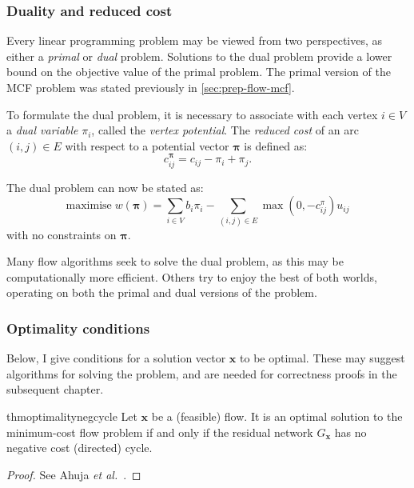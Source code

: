 \subsubsection{Duality and reduced cost} \label{sec:prep-flow-rc-and-dual}


Every linear programming problem may be viewed from two perspectives, as either a \emph{primal} or \emph{dual} problem. Solutions to the dual problem provide a lower bound on the objective value of the primal problem. The primal version of the MCF problem was stated previously in \cref{sec:prep-flow-mcf}. 

To formulate the dual problem, it is necessary to associate with each vertex $i \in V$ a \emph{dual variable} $\pi_i$, called the \emph{vertex potential}. The \emph{reduced cost} of an arc $(i,j)\in E$ with respect to a potential vector $\boldsymbol{\pi}$ is defined as:
\begin{equation} \label{eq:reduced-costs}
c_{ij}^{\boldsymbol{\pi}}=c_{ij}-\pi_{i}+\pi_{j}.
\end{equation}

The dual problem can now be stated as:
\begin{equation}
\mathrm{maximise}\; w(\boldsymbol{\pi})=\sum_{i\in V}b_{i}\pi_{i}-\sum_{(i,j)\in E}\max\left(0,-c_{ij}^{\pi}\right)u_{ij}
\end{equation}
with no constraints on $\boldsymbol{\pi}$.

Many flow algorithms seek to solve the dual problem, as this may be computationally more efficient. Others try to enjoy the best of both worlds, operating on both the primal and dual versions of the problem.

\subsubsection{Optimality conditions} \label{sec:prep-flow-optimality}


Below, I give conditions for a solution vector $\mathbf{x}$ to be optimal. These may suggest algorithms for solving the problem, and are needed for correctness proofs in the subsequent chapter. \\

\begin{restatable}{thm}{optimalitynegcycle}
\label{thm:optimality-neg-cycle}
Let $\mathbf{x}$ be a (feasible) flow. It is an optimal solution to the minimum-cost flow problem if and only if the residual network $G_\mathbf{x}$ has no negative cost (directed) cycle.
\end{restatable}
\begin{proof}
See Ahuja \textit{et al.}~\cite[p.~307]{Ahuja:1993}.
\end{proof}

